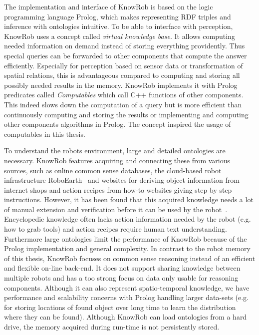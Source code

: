 The implementation and interface of KnowRob is based on the logic
programming language Prolog, which makes representing RDF triples and
inference with ontologies intuitive.  To be able to interface with
perception, KnowRob uses a concept called \emph{virtual knowledge
  base}. It allows computing needed information on demand instead of
storing everything providently. Thus special queries can be forwarded
to other components that compute the answer efficiently.  Especially
for perception based on sensor data or transformation of spatial
relations, this is advantageous compared to computing and storing all
possibly needed results in the memory.  KnowRob implements it with
Prolog predicates called \emph{Computables} which call C++ functions
of other components. This indeed slows down the computation of a query
but is more efficient than continuously computing and storing the
results or implementing and computing other components algorithms in
Prolog.  The concept inspired the usage of computables in this thesis.

To understand the robots environment, large and detailed ontologies
are necessary. KnowRob features acquiring and connecting these from
various sources, such as online common sense databases, the
cloud-based robot infrastructure RoboEarth~\cite{roboearth} and
websites for deriving object information from internet shops and
action recipes from how-to websites giving step by step instructions.
However, it has been found that this acquired knowledge needs a lot of
manual extension and verification before it can be used by the
robot~\cite{KnowRob-Web}. Encyclopedic knowledge often lacks action
information needed by the robot (e.g. how to grab tools) and
action recipes require human text understanding.
Furthermore large ontologies limit the performance of KnowRob because
of the Prolog implementation and general complexity. In contrast to
the robot memory of this thesis, KnowRob focuses on common
sense reasoning instead of an efficient and flexible on-line
back-end. It does not support sharing knowledge between multiple
robots and has a too strong focus on data only usable for reasoning
components. Although it can also represent spatio-temporal knowledge,
we have performance and scalability concerns with Prolog handling
larger data-sets (e.g. for storing locations of found object over long
time to learn the distribution where they can be found). Although
KnowRob can load ontologies from a hard drive, the memory acquired
during run-time is not persistently stored.


